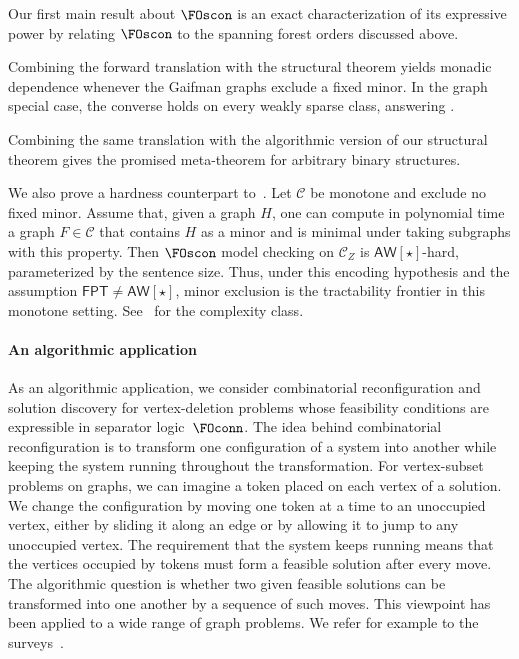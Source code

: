 \documentclass[1p,number,11pt]{elsarticle}
\theoremstyle{plain}
\newcommand{\Cc}{\mathscr{C}}
\begin{document}
Our first main result about $\FOscon$ is an exact characterization of its expressive power by relating $\FOscon$ to the spanning forest orders discussed above.


Combining the forward translation with the structural theorem yields monadic
dependence whenever the Gaifman graphs exclude a fixed minor. In the
graph special case, the converse holds on every weakly sparse class, answering
.


Combining the same translation with the algorithmic version of our structural
theorem gives the promised meta-theorem for arbitrary binary structures.


We also prove a hardness counterpart to~. Let $\Cc$ be monotone and exclude no fixed minor. 
Assume that, given a graph $H$, one can compute in polynomial time a graph $F\in\Cc$ that contains $H$ as a minor and is minimal under taking subgraphs with this property. 
Then $\FOscon$ model checking on $\Cc_Z$ is $\mathsf{AW}[\star]$-hard, parameterized by the sentence size. 
Thus, under this encoding hypothesis and the assumption $\mathsf{FPT}\ne\mathsf{AW}[\star]$, minor exclusion is the tractability frontier in this monotone setting. 
See~\cite[Section~8.6]{Flum2006ParameterizedCT} for the complexity class.


\medskip

\paragraph{An algorithmic application}

As an algorithmic application, we consider combinatorial reconfiguration and solution discovery for vertex-deletion problems whose feasibility conditions are expressible in separator logic~$\FOconn$.
The idea behind combinatorial reconfiguration is to transform one configuration of a system into another while keeping the system running throughout the transformation.
For vertex-subset problems on graphs, we can imagine a token placed on each vertex of a solution.
We change the configuration by moving one token at a time to an unoccupied vertex, either by sliding it along an edge or by allowing it to jump to any unoccupied vertex.
The requirement that the system keeps running means that the vertices occupied by tokens must form a feasible solution after every move.
The algorithmic question is whether two given feasible solutions can be transformed into one another by a sequence of such moves.
This viewpoint has been applied to a wide range of
graph problems. 
We refer for example to the surveys~\cite{journals/cosrev/BousquetMNS24,nishimura18reconfiguration,books/cu/p/Heuvel13}.
\end{document}
